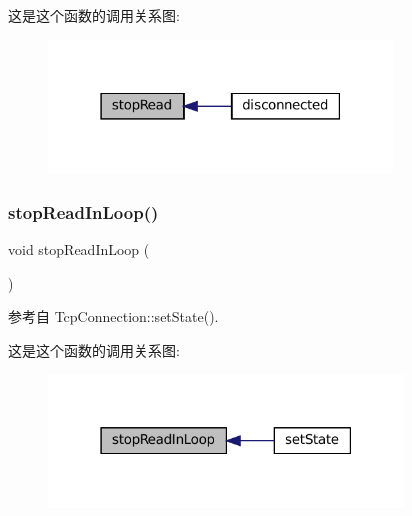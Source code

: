 这是这个函数的调用关系图\+:
\nopagebreak
\begin{figure}[H]
\begin{center}
\leavevmode
\includegraphics[width=259pt]{classmuduo_1_1net_1_1TcpConnection_a36b0d441712db3b0e94cead68e9ff10a_icgraph}
\end{center}
\end{figure}
\mbox{\label{classmuduo_1_1net_1_1TcpConnection_ab1a8c5f0e39e33c4088dbeef5c2a4864}} 
\subsubsection{\texorpdfstring{stop\+Read\+In\+Loop()}{stopReadInLoop()}}
{\footnotesize\ttfamily void stop\+Read\+In\+Loop (\begin{DoxyParamCaption}{ }\end{DoxyParamCaption})\hspace{0.3cm}{\ttfamily [private]}}



参考自 Tcp\+Connection\+::set\+State().

这是这个函数的调用关系图\+:
\nopagebreak
\begin{figure}[H]
\begin{center}
\leavevmode
\includegraphics[width=267pt]{classmuduo_1_1net_1_1TcpConnection_ab1a8c5f0e39e33c4088dbeef5c2a4864_icgraph}
\end{center}
\end{figure}


